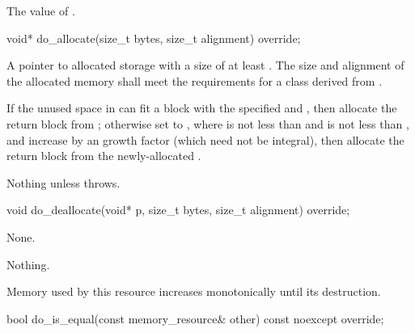 \begin{itemdescr}
\pnum
\returns
The value of .
\end{itemdescr}

%
\begin{itemdecl}
void* do_allocate(size_t bytes, size_t alignment) override;
\end{itemdecl}

\begin{itemdescr}
\pnum
\returns
A pointer to allocated storage
with a size of at least .
The size and alignment of the allocated memory shall meet the requirements
for a class derived from .

\pnum
\effects
If the unused space in 
can fit a block with the specified  and ,
then allocate the return block from ;
otherwise set  to ,
where  is not less than  and
 is not less than ,
and increase 
by an  growth factor (which need not be integral),
then allocate the return block from the newly-allocated .

\pnum
\throws
Nothing unless  throws.
\end{itemdescr}

%
\begin{itemdecl}
void do_deallocate(void* p, size_t bytes, size_t alignment) override;
\end{itemdecl}

\begin{itemdescr}
\pnum
\effects
None.

\pnum
\throws
Nothing.

\pnum
\remarks
Memory used by this resource increases monotonically until its destruction.
\end{itemdescr}

%
\begin{itemdecl}
bool do_is_equal(const memory_resource& other) const noexcept override;
\end{itemdecl}

